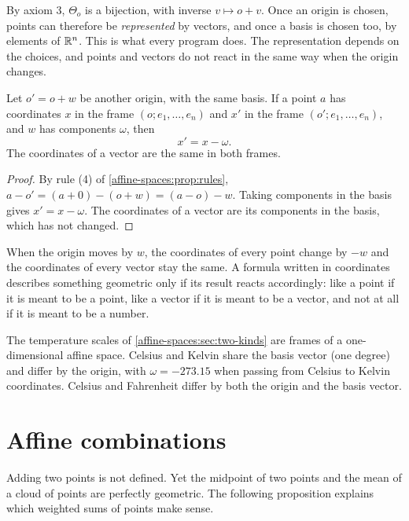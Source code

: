 \begin{notechapter}
By axiom 3, $\Theta_o$ is a bijection, with inverse $v\mapsto o + v$. Once
an origin is chosen, points can therefore be \emph{represented} by vectors,
and once a basis is chosen too, by elements of $\mathbb{R}^n$. This is what every
program does. The representation depends on the choices, and points and
vectors do not react in the same way when the origin changes.

\begin{proposition}\label{affine-spaces:prop:origin-change}
Let $o' = o + w$ be another origin, with the same basis. If a point $a$ has
coordinates $x$ in the frame $(o; e_1,\dots,e_n)$ and $x'$ in the frame
$(o'; e_1,\dots,e_n)$, and $w$ has components $\omega$, then
\[
  x' = x - \omega .
\]
The coordinates of a vector are the same in both frames.
\end{proposition}

\begin{proof}
By rule (4) of \cref{affine-spaces:prop:rules},
$a - o' = (a + 0) - (o + w) = (a - o) - w$. Taking components in the basis
gives $x' = x - \omega$. The coordinates of a vector are its components in
the basis, which has not changed.
\end{proof}

\begin{keyidea}
When the origin moves by $w$, the coordinates of every point change by
$-w$ and the coordinates of every vector stay the same. A formula written
in coordinates describes something geometric only if its result reacts
accordingly: like a point if it is meant to be a point, like a vector if
it is meant to be a vector, and not at all if it is meant to be a number.
\end{keyidea}

The temperature scales of \cref{affine-spaces:sec:two-kinds} are frames of a
one-dimensional affine space. Celsius and Kelvin share the basis vector
(one degree) and differ by the origin, with $\omega = -273.15$ when passing
from Celsius to Kelvin coordinates. Celsius and Fahrenheit differ by both
the origin and the basis vector.

\section{Affine combinations}\label{affine-spaces:sec:combinations}

Adding two points is not defined. Yet the midpoint of two points and the
mean of a cloud of points are perfectly geometric. The following
proposition explains which weighted sums of points make sense.


\end{notechapter}
